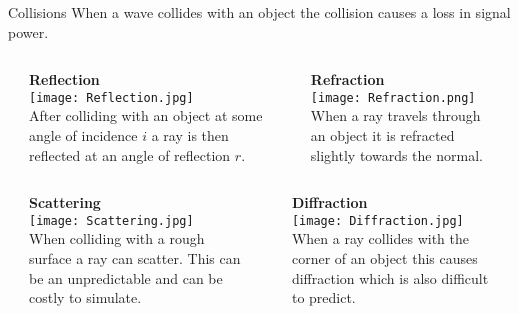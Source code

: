 \documentclass[final]{beamer}
\theoremstyle{plain}
\theoremstyle{definition}
\theoremstyle{remark}
\newlength{\twocolwid}
\begin{document}
\begin{frame}[t]
\begin{columns}[t]
\begin{column}{\twocolwid}
\begin{block}{Collisions}
\vspace{-1.5cm}
When a wave collides with an object the collision causes a loss in signal power. 
\vspace{0.5cm}
\begin{columns}
\begin{column}{0.03\linewidth}
\end{column}
\begin{column}{0.46\linewidth}
\textbf{Reflection} \\
\texttt{[image: Reflection.jpg]} 
\cite{Reflection} \\
After colliding with an object at some angle of incidence $i$ a ray is then reflected at an angle of reflection $r$.
\end{column}
\begin{column}{0.02\linewidth}
\end{column}
\begin{column}{0.46\linewidth}
\textbf{Refraction} \\
\texttt{[image: Refraction.png]} 
\cite{Refraction} 
\\ 
When a ray travels through an object it is refracted slightly towards the normal.
\end{column}
\begin{column}{0.03\linewidth}
\end{column}
\end{columns}
\end{block}

\begin{mdframed}[backgroundcolor=jblue!15, linecolor=jblue!70,
  linewidth=20pt,
  topline=true,
  rightline=true,
  leftline=true, bottomline=true, userdefinedwidth=0.999999999999999\linewidth]
\begin{columns}
\begin{column}{0.03\linewidth}
\end{column}
\begin{column}{0.46\linewidth}
\textbf{Scattering} \\
\texttt{[image: Scattering.jpg]} 
\\ When colliding with a rough surface a ray can scatter. This can be an unpredictable and can be costly to simulate. \cite{Antennas2007}
\end{column}
\begin{column}{0.02\linewidth}
\end{column}
\begin{column}{0.46\linewidth}
\textbf{Diffraction} \\
\texttt{[image: Diffraction.jpg]}
\\ 
When a ray collides with the corner of an object this causes diffraction which is also difficult to predict.
\end{column}
\begin{column}{0.03\linewidth}
\end{column}
\end{columns}
\end{mdframed}



\end{column}
\end{columns}
\end{frame}
\end{document}
